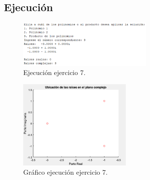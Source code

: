 \documentclass[a4paper, 12pt]{article}
\begin{document}
	\subsection{Ejecución}
	\begin{figure}[ht]
		\centering
		\includegraphics[width=0.6\textwidth]{figures/ejc7.png}
		\caption{Ejecución ejercicio 7.}
		\label{ejec7}
	\end{figure}
	\begin{figure}[ht]
		\centering
		\includegraphics[width=0.5\textwidth]{figures/graf7.png}
		\caption{Gráfico ejecución ejercicio 7.}
		\label{grafica7}
	\end{figure}
	\newpage
	
	\printbibliography
	
\end{document}

